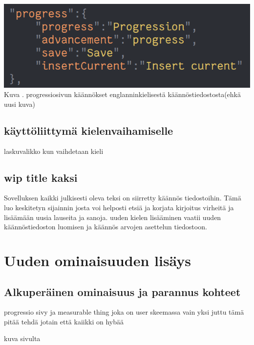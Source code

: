 \documentclass[11pt,a4paper,titlepage,oneside]{article}
\begin{document}
\includegraphics[width = 15cm]{src/public/oppar/translationfileEng.png}\\
Kuva \getImgCount. {} progressiosivun käännökset englanninkielisestä käännöstiedostosta(ehkä uusi kuva)
\medskip

\subsection{käyttöliittymä kielenvaihamiselle}

laskuvalikko kun vaihdetaan kieli


\subsection{wip title kaksi}
Sovelluksen kaikki julkisesti oleva teksi on siirretty käännös tiedostoihin. 
Tämä luo keskitetyn sijainnin josta voi helposti etsiä ja korjata kirjoitus virheitä ja lisäämään uusia lauseita ja sanoja.
uuden kielen lisääminen vaatii uuden käännöstiedoston luomisen ja käännös arvojen asettelun tiedostoon.
\medskip














\newpage
\section{Uuden ominaisuuden lisäys}

\subsection{Alkuperäinen ominaisuus ja parannus kohteet}
progressio sivy ja measurable thing joka on user skeemassa vain yksi juttu
tämä pitää tehdä jotain että kaiikki on hybää
\medskip

kuva sivulta
\end{document}
